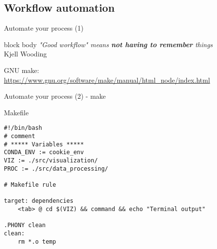 \documentclass[10pt,aspectratio=169,notes]{beamer} %
\begin{document}
\subsection{Workflow automation}
\begin{frame}[label=frame20]{Automate your process (1)}
\begin{beamercolorbox}[wd=0.8\textwidth,rounded=true,shadow=true]{block body}
	\emph{"Good workflow" means \textbf{not having to remember} things}\\
	\flushright
	Kjell Wooding
\end{beamercolorbox}

GNU make:\\
\url{https://www.gnu.org/software/make/manual/html_node/index.html}

\end{frame}
\begin{frame}[fragile,label=frame21]{Automate your process (2) - make}
\begin{comment}
\begin{block}{}
\begin{verbatim}
int main() {
printf("hello, world");
return 0;
}
\end{verbatim}
\end{block}

\begin{exampleblock}{code}
\textcolor{orange}{target}: \textcolor{Purple}{dependencies}
\\
	command
\end{exampleblock}
\end{comment}

\begin{block}{Makefile}
\begin{verbatim}
#!/bin/bash
# comment
# ***** Variables *****
CONDA_ENV := cookie_env
VIZ := ./src/visualization/
PROC := ./src/data_processing/

# Makefile rule

target: dependencies
	<tab> @ cd $(VIZ) && command && echo "Terminal output"
	
.PHONY clean
clean:
	rm *.o temp
\end{verbatim}
\end{block}
\end{frame}
\end{document}
